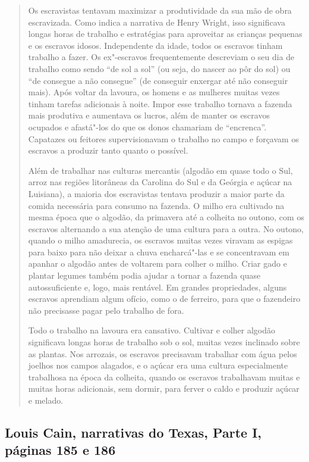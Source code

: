 \begin{quote}
Os escravistas tentavam maximizar a produtividade da sua mão de
obra escravizada. Como indica a narrativa de Henry Wright, isso
significava longas horas de trabalho e estratégias para aproveitar as
crianças pequenas e os escravos idosos. Independente da idade, todos os
escravos tinham trabalho a fazer. Os ex"-escravos frequentemente
descreviam o seu dia de trabalho como sendo ``de sol a sol'' (ou seja,
do nascer ao pôr do sol) ou ``de consegue a não consegue'' (de conseguir
enxergar até não conseguir mais). Após voltar da lavoura, os homens e as
mulheres muitas vezes tinham tarefas adicionais à noite. Impor esse
trabalho tornava a fazenda mais produtiva e aumentava os lucros, além de
manter os escravos ocupados e afastá"-los do que os donos chamariam de
``encrenca''. Capatazes ou feitores supervisionavam o trabalho no campo
e forçavam os escravos a produzir tanto quanto o possível.

Além de trabalhar nas culturas mercantis (algodão em quase todo o
Sul, arroz nas regiões litorâneas da Carolina do Sul e da Geórgia e
açúcar na Luisiana), a maioria dos escravistas tentava produzir a maior
parte da comida necessária para consumo na fazenda. O milho era
cultivado na mesma época que o algodão, da primavera até a colheita no
outono, com os escravos alternando a sua atenção de uma cultura para a
outra. No outono, quando o milho amadurecia, os escravos muitas vezes
viravam as espigas para baixo para não deixar a chuva encharcá"-las e se
concentravam em apanhar o algodão antes de voltarem para colher o milho.
Criar gado e plantar legumes também podia ajudar a tornar a fazenda
quase autossuficiente e, logo, mais rentável. Em grandes propriedades,
alguns escravos aprendiam algum ofício, como o de ferreiro, para que o
fazendeiro não precisasse pagar pelo trabalho de fora.

Todo o trabalho na lavoura era cansativo. Cultivar e colher
algodão significava longas horas de trabalho sob o sol, muitas vezes
inclinado sobre as plantas. Nos arrozais, os escravos precisavam
trabalhar com água pelos joelhos nos campos alagados, e o açúcar era uma
cultura especialmente trabalhosa na época da colheita, quando os
escravos trabalhavam muitas e muitas horas adicionais, sem dormir, para
ferver o caldo e produzir açúcar e melado.
\end{quote}

\subsection{Louis Cain, narrativas do Texas, Parte I, páginas 185 e 186} \label{ref42}

